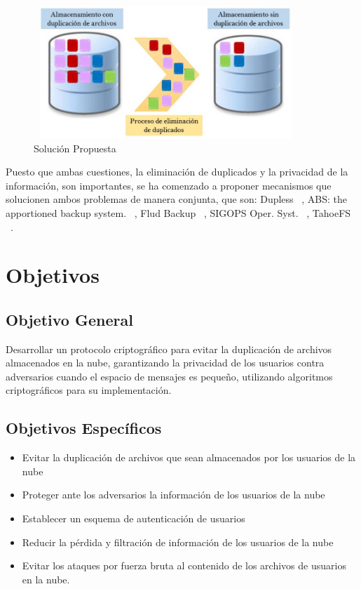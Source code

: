 \begin{figure}[H]
\centering
	\includegraphics[width=10cm, height=5cm]{./images/Deduplicacion.jpg}
	\caption{Solución Propuesta}
	\label{fig:1-3-1}
\end{figure}



Puesto que ambas cuestiones, la eliminación de duplicados y la privacidad de la información, son importantes, se ha comenzado a
proponer mecanismos que solucionen ambos problemas de manera conjunta, que son: Dupless ~\cite{Bellare}, ABS: the apportioned backup
system. ~\cite{abs}, Flud Backup ~\cite{flud}, SIGOPS Oper. Syst. ~\cite{sigops}, TahoeFS ~\cite{tahoe}.


\section{Objetivos} %

    \subsection{Objetivo General} %
    Desarrollar un protocolo criptográfico para evitar la duplicación de archivos almacenados en la nube, garantizando la privacidad de los usuarios contra adversarios cuando el espacio de mensajes es pequeño, utilizando algoritmos criptográficos para su implementación. 
     
    \subsection{Objetivos Específicos} %
	\begin{itemize}
		\item Evitar la duplicación de archivos que sean almacenados por los usuarios de la nube
		\item Proteger ante los adversarios la información de los usuarios de la nube
		\item Establecer un esquema de autenticación de usuarios 
		\item Reducir la pérdida y filtración de información de los usuarios de la nube
		\item Evitar los ataques por fuerza bruta al contenido de los archivos de usuarios en la nube. 
 	\end{itemize}
    